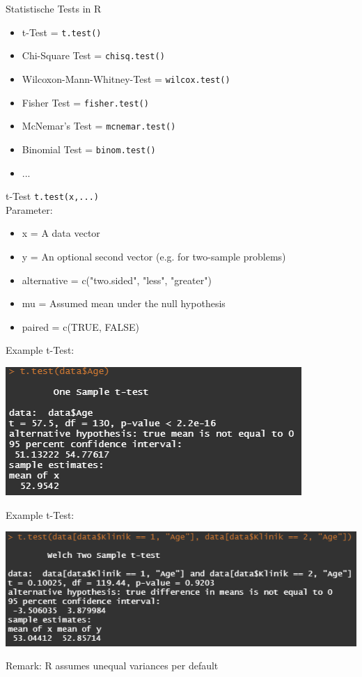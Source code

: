 \documentclass[xcolor=dvipsnames, aspectratio = 169]{beamer}
\begin{document}
\begin{frame}[fragile]{Statistische Tests in R}
	\begin{itemize}
		\item t-Test = \verb+t.test()+
		\item Chi-Square Test = \verb+chisq.test()+
		\item Wilcoxon-Mann-Whitney-Test = \verb+wilcox.test()+
		\item Fisher Test = \verb+fisher.test()+
		\item McNemar's Test = \verb+mcnemar.test()+
		\item Binomial Test = \verb+binom.test()+
		\item ...
	\end{itemize}
\end{frame}


\begin{frame}[fragile]{t-Test}
\verb+t.test(x,...)+\\
Parameter:
	\begin{itemize}
		\item x = A data vector
		\item y = An optional second vector (e.g. for two-sample problems)
		\item alternative = c("two.sided", "less", "greater")
		\item mu = Assumed mean under the null hypothesis
		\item paired = c(TRUE, FALSE)
	\end{itemize}
\end{frame}

\begin{frame}[fragile]{Example t-Test:}	
	\begin{center}
		\includegraphics{OneSampleTtest}
	\end{center}
\end{frame}

\begin{frame}[fragile]{Example t-Test:}	
	\begin{center}
		\includegraphics{TwoSampleTtest}
	\end{center}
Remark: R assumes unequal variances per default
\end{frame}
\end{document}
